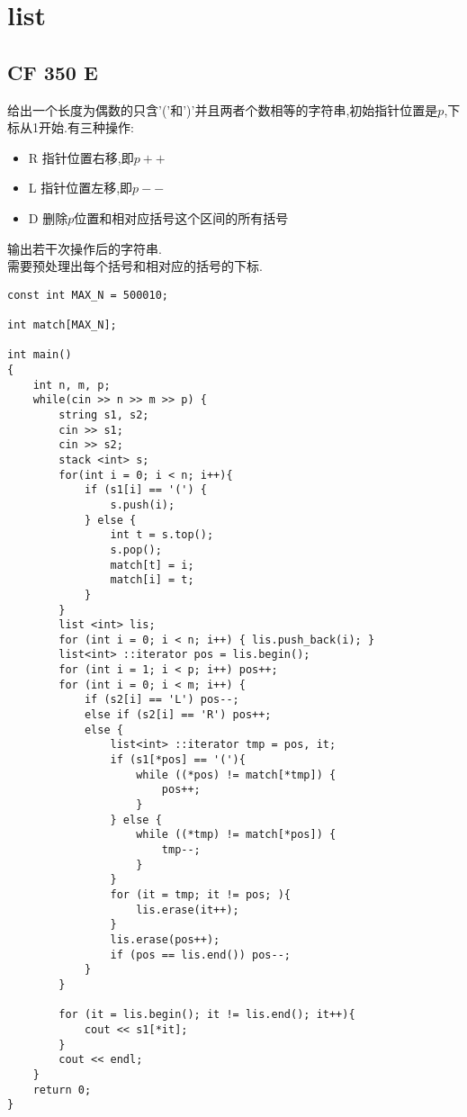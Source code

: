 \section{list}

\subsection{CF 350 E}
给出一个长度为偶数的只含'('和')'并且两者个数相等的字符串,初始指针位置是$p$,下标从1开始.有三种操作:
\begin{itemize}
\item R 指针位置右移,即$p++$
\item L 指针位置左移,即$p--$
\item D 删除$p$位置和相对应括号这个区间的所有括号
\end{itemize}
输出若干次操作后的字符串. \\

需要预处理出每个括号和相对应的括号的下标.
\begin{lstlisting}
const int MAX_N = 500010;

int match[MAX_N];

int main()
{
	int n, m, p;
	while(cin >> n >> m >> p) {
		string s1, s2;
		cin >> s1;
		cin >> s2;
		stack <int> s;
		for(int i = 0; i < n; i++){
			if (s1[i] == '(') {
				s.push(i);
			} else {
				int t = s.top();
				s.pop();
				match[t] = i;
				match[i] = t;
			}
		}
		list <int> lis;
		for (int i = 0; i < n; i++) { lis.push_back(i); }
		list<int> ::iterator pos = lis.begin();
		for (int i = 1; i < p; i++) pos++;
		for (int i = 0; i < m; i++) {
			if (s2[i] == 'L') pos--;
			else if (s2[i] == 'R') pos++;
			else {
				list<int> ::iterator tmp = pos, it;
				if (s1[*pos] == '('){
					while ((*pos) != match[*tmp]) {
						pos++;
					}
				} else {
					while ((*tmp) != match[*pos]) {
						tmp--;
					}
				}
				for (it = tmp; it != pos; ){
					lis.erase(it++);
				}
				lis.erase(pos++);
				if (pos == lis.end()) pos--;
			}
		}
		
		for (it = lis.begin(); it != lis.end(); it++){
			cout << s1[*it];
		}
		cout << endl;
	}
	return 0;
}
\end{lstlisting}

%

